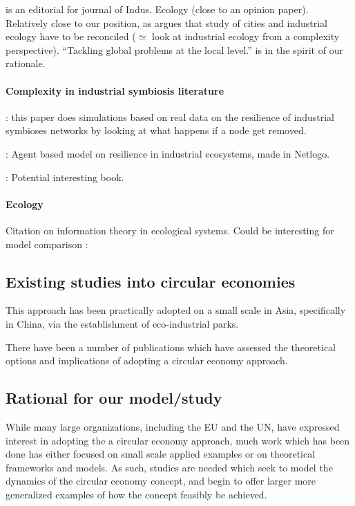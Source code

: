 \documentclass[fleqn,10pt]{wlscirep}
\begin{document}
\cite{bai2007industrial} is an editorial for journal of Indus. Ecology (close to an opinion paper). Relatively close to our position, as argues that study of cities and industrial ecology have to be reconciled ($\simeq$ look at industrial ecology from a complexity perspective). ``Tackling global problems at the local level.'' is in the spirit of our rationale.


\paragraph{Complexity in industrial symbiosis literature}

\cite{li2015resilience} : this paper does simulations based on real data on the resilience of industrial symbioses networks by looking at what happens if a node get removed.

\cite{zhu2013exploring} : Agent based model on resilience in industrial ecosystems, made in Netlogo.

\cite{may1973stability} : Potential interesting book.



\paragraph{Ecology}


Citation on information theory in ecological systems. Could be interesting for model comparison : \cite{ulanowicz1991ecosystem}




\subsection{Existing studies into circular economies}

This approach has been practically adopted on a small scale in Asia, specifically in China, via the establishment of eco-industrial parks. 

There have been a number of publications which have assessed the theoretical options and implications of adopting a circular economy approach. 

\subsection{Rational for our model/study}

While many large organizations, including the EU and the UN,  have expressed interest in adopting the a circular economy approach, much work which has been done has either focused on small scale applied examples or on theoretical frameworks and models. As such, studies are needed which seek to model the dynamics of the circular economy concept, and begin to offer larger more generalized examples of how the concept feasibly be achieved. 
\end{document}
